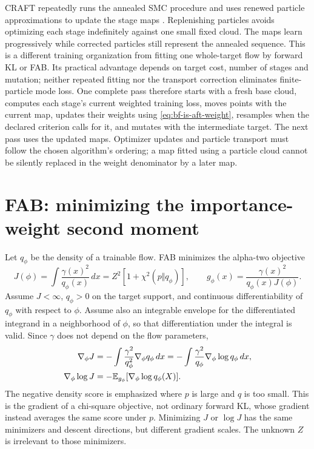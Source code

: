 CRAFT repeatedly runs the annealed SMC procedure and uses renewed particle
approximations to update the stage maps
\citep[Equation 5, Algorithms 1--3 and supplement]{matthews2022craft}.
Replenishing particles avoids optimizing each stage indefinitely against one
small fixed cloud. The maps learn progressively while corrected particles still
represent the annealed sequence. This is a different training organization from
fitting one whole-target flow by forward KL or FAB. Its practical advantage
depends on target cost, number of stages and mutation; neither repeated fitting
nor the transport correction eliminates finite-particle mode loss.
One complete pass therefore starts with a fresh base cloud, computes each
stage's current weighted training loss, moves points with the current map,
updates their weights using \eqref{eq:bf-is-aft-weight}, resamples when the
declared criterion calls for it, and mutates with the intermediate target.
The next pass uses the updated maps. Optimizer updates and particle transport
must follow the chosen algorithm's ordering; a map fitted using a particle
cloud cannot be silently replaced in the weight denominator by a later map.



\section{FAB: minimizing the importance-weight second moment}
\label{sec:bf-is-fab}

Let $q_\phi$ be the density of a trainable flow. FAB minimizes the alpha-two
objective
\begin{equation}
 J(\phi)=\int\frac{\gamma(x)^2}{q_\phi(x)}\,dx
 =Z^2[1+\chi^2(p\Vert q_\phi)],\qquad
 g_\phi(x)=\frac{\gamma(x)^2}{q_\phi(x)J(\phi)}.
 \label{eq:bf-fab-objective}
\end{equation}
Assume $J<\infty$, $q_\phi>0$ on the target support, and continuous
differentiability of $q_\phi$ with respect to $\phi$. Assume also an integrable
envelope for the differentiated integrand in a neighborhood of $\phi$, so that
differentiation under the integral is valid.
Since $\gamma$ does not depend on the flow parameters,
\begin{align}
 \nabla_\phi J
 &=-\int\frac{\gamma^2}{q_\phi^2}\nabla_\phi q_\phi\,dx
 =-\int\frac{\gamma^2}{q_\phi}\nabla_\phi\log q_\phi\,dx,\\
 \nabla_\phi\log J
 &=-\mathbb{E}_{g_\phi}[\nabla_\phi\log q_\phi(X)].
 \label{eq:bf-fab-gradient}
\end{align}
The negative density score is emphasized where $p$ is large and $q$ is too
small. This is the gradient of a chi-square objective, not ordinary forward KL,
whose gradient instead averages the same score under $p$. Minimizing $J$ or
$\log J$ has the same minimizers and descent directions, but different gradient
scales. The unknown $Z$ is irrelevant to those minimizers.


